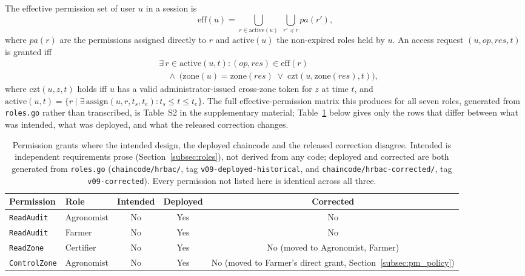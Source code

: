 \documentclass[a4paper,fleqn]{cas-sc}
\begin{document}
The effective permission set of user $u$ in a session is
\begin{equation}
\mathrm{eff}(u) = \bigcup_{r \in \mathrm{active}(u)}
  \; \bigcup_{r' \preceq r} pa(r'),
\end{equation}
where $pa(r)$ are the permissions assigned directly to $r$ and
$\mathrm{active}(u)$ the non-expired roles held by $u$. An access request
$(u, \mathit{op}, \mathit{res}, t)$ is granted iff
\begin{equation}
\begin{aligned}
&\exists\, r \in \mathrm{active}(u,t):
  (\mathit{op},\mathit{res}) \in \mathrm{eff}(r)\\
&\quad \land\;
  \bigl(\mathrm{zone}(u) = \mathrm{zone}(\mathit{res})
  \;\lor\; \mathrm{czt}(u, \mathrm{zone}(\mathit{res}), t)\bigr),
\end{aligned}
\label{eq:grant}
\end{equation}
where $\mathrm{czt}(u,z,t)$ holds iff $u$ has a valid administrator-issued
cross-zone token for $z$ at time $t$, and
$\mathrm{active}(u,t) = \{r \mid \exists\,\mathrm{assign}(u,r,t_s,t_e):
t_s \le t \le t_e\}$. The full effective-permission matrix this produces for
all seven roles, generated from \texttt{roles.go} rather than transcribed,
is Table~S2 in the supplementary material; Table~\ref{tab:permdiff} below
gives only the rows that differ between what was intended, what was
deployed, and what the released correction changes.

\begin{table}[pos=t]
\caption{Permission grants where the intended design, the deployed
  chaincode and the released correction disagree. Intended is independent
  requirements prose (Section~\ref{subsec:roles}), not derived from any
  code; deployed and corrected are both generated from \texttt{roles.go}
  (\texttt{chaincode/hrbac/}, tag \texttt{v09-deployed-historical}, and
  \texttt{chaincode/hrbac-corrected/}, tag \texttt{v09-corrected}). Every
  permission not listed here is identical across all three.}
\label{tab:permdiff}
\small
\begin{tabularx}{\columnwidth}{@{}lXccc@{}}
\toprule
Permission & Role & Intended & Deployed & Corrected \\
\midrule
\texttt{ReadAudit}   & Agronomist & No & Yes & No \\
\texttt{ReadAudit}   & Farmer     & No & Yes & No \\
\texttt{ReadZone}    & Certifier  & No & Yes & No (moved to Agronomist, Farmer) \\
\texttt{ControlZone} & Agronomist & No & Yes & No (moved to Farmer's direct
  grant, Section~\ref{subsec:pm_policy}) \\
\bottomrule
\end{tabularx}
\end{table}
\end{document}
